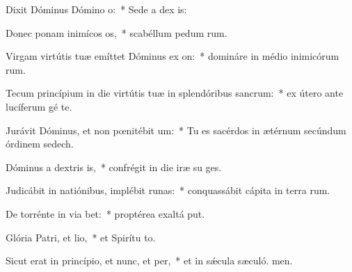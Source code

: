 \item Dixit Dóminus Dómino o:~* Sede a dex is:
\item Donec ponam inimícos os,~* scabéllum pedum rum.
\item Virgam virtútis tuæ emíttet Dóminus ex on:~* domináre in médio inimicórum rum.
\item Tecum princípium in die virtútis tuæ in splendóribus sancrum:~* ex útero ante lucíferum gé te.
\item Jurávit Dóminus, et non pœnitébit um:~* Tu es sacérdos in ætérnum secúndum órdinem sedech.
\item Dóminus a dextris is,~* confrégit in die iræ su ges.
\item Judicábit in natiónibus, implébit runas:~* conquassábit cápita in terra rum.
\item De torrénte in via bet:~* proptérea exaltá put.
\item Glória Patri, et lio,~* et Spirítu to.
\item Sicut erat in princípio, et nunc, et per,~* et in sǽcula sæculó. men.

